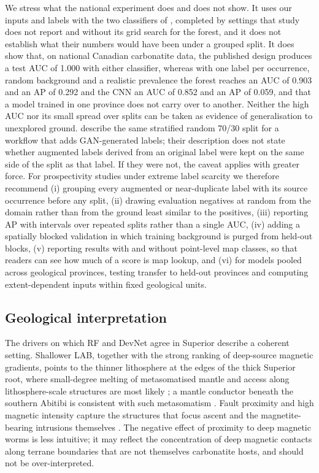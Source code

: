 \documentclass[pdflatex,sn-apa]{sn-jnl}
\begin{document}
We stress what the national experiment does and does not show. It uses our inputs and labels with the two classifiers of \citet{Parsa2024}, completed by settings that study does not report and without its grid search for the forest, and it does not establish what their numbers would have been under a grouped split. It does show that, on national Canadian carbonatite data, the published design produces a test AUC of 1.000 with either classifier, whereas with one label per occurrence, random background and a realistic prevalence the forest reaches an AUC of 0.903 and an AP of 0.292 and the CNN an AUC of 0.852 and an AP of 0.059, and that a model trained in one province does not carry over to another. Neither the high AUC nor its small spread over splits can be taken as evidence of generalisation to unexplored ground. \citet{Parsa2025} describe the same stratified random 70/30 split for a workflow that adds GAN-generated labels; their description does not state whether augmented labels derived from an original label were kept on the same side of the split as that label. If they were not, the caveat applies with greater force. For prospectivity studies under extreme label scarcity we therefore recommend (i) grouping every augmented or near-duplicate label with its source occurrence before any split, (ii) drawing evaluation negatives at random from the domain rather than from the ground least similar to the positives, (iii) reporting AP with intervals over repeated splits rather than a single AUC, (iv) adding a spatially blocked validation in which training background is purged from held-out blocks, (v) reporting results with and without point-level map classes, so that readers can see how much of a score is map lookup, and (vi) for models pooled across geological provinces, testing transfer to held-out provinces and computing extent-dependent inputs within fixed geological units.

\subsection{Geological interpretation}\label{sec:disc-geology}

The drivers on which RF and DevNet agree in Superior describe a coherent setting. Shallower LAB, together with the strong ranking of deep-source magnetic gradients, points to the thinner lithosphere at the edges of the thick Superior root, where small-degree melting of metasomatised mantle and access along lithosphere-scale structures are most likely \citep{Griffin2013,Groves2021,Hoggard2020}; a mantle conductor beneath the southern Abitibi is consistent with such metasomatism \citep{Snyder2021}. Fault proximity and high magnetic intensity capture the structures that focus ascent and the magnetite-bearing intrusions themselves \citep{Thomas2016}. The negative effect of proximity to deep magnetic worms is less intuitive; it may reflect the concentration of deep magnetic contacts along terrane boundaries that are not themselves carbonatite hosts, and should not be over-interpreted.
\end{document}
